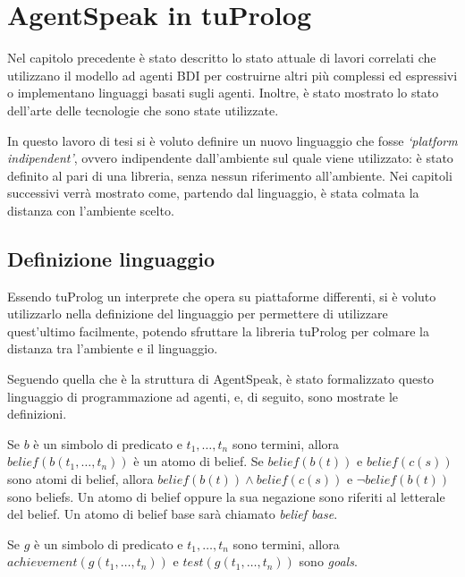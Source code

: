 \chapter{AgentSpeak in tuProlog}\label{chap:agentspeak-2p}
Nel capitolo precedente è stato descritto lo stato attuale di lavori correlati che utilizzano il modello ad agenti BDI per costruirne altri più complessi ed espressivi o implementano linguaggi basati sugli agenti. Inoltre, è stato mostrato lo stato dell'arte delle tecnologie che sono state utilizzate.

In questo lavoro di tesi si è voluto definire un nuovo linguaggio che fosse \textit{`platform indipendent'}, ovvero indipendente dall'ambiente sul quale viene utilizzato: è stato definito al pari di una libreria, senza nessun riferimento all'ambiente. Nei capitoli successivi verrà mostrato come, partendo dal linguaggio, è stata colmata la distanza con l'ambiente scelto.

\section{Definizione linguaggio}\label{sctn:definizioneLinguaggio}
Essendo tuProlog un interprete che opera su piattaforme differenti, si è voluto utilizzarlo nella definizione del linguaggio per permettere di utilizzare quest'ultimo facilmente, potendo sfruttare la libreria tuProlog per colmare la distanza tra l'ambiente e il linguaggio.

Seguendo quella che è la struttura di AgentSpeak, è stato formalizzato questo linguaggio di programmazione ad agenti, e, di seguito, sono mostrate le definizioni.

\smallskip
\begin{defn}
Se $b$ è un simbolo di predicato e $t_1, \ldots, t_n$ sono termini, allora $belief(b(t_1, \ldots, t_n))$ è un atomo di belief.
Se $belief(b(t))$ e $belief(c(s))$ sono atomi di belief, allora $belief(b(t)) \land belief(c(s))$ e $\neg belief(b(t))$ sono beliefs.
Un atomo di belief oppure la sua negazione sono riferiti al letterale del belief. Un atomo di belief base sarà chiamato \textit{belief base}.
\end{defn}

\smallskip
\begin{defn}\label{defn:goals}
Se $g$ è un simbolo di predicato e $t_1, \ldots, t_n$ sono termini, allora $achievement(g(t_1, \ldots, t_n))$ e $test(g(t_1, \ldots, t_n))$ sono \textit{goals}.
\end{defn}

